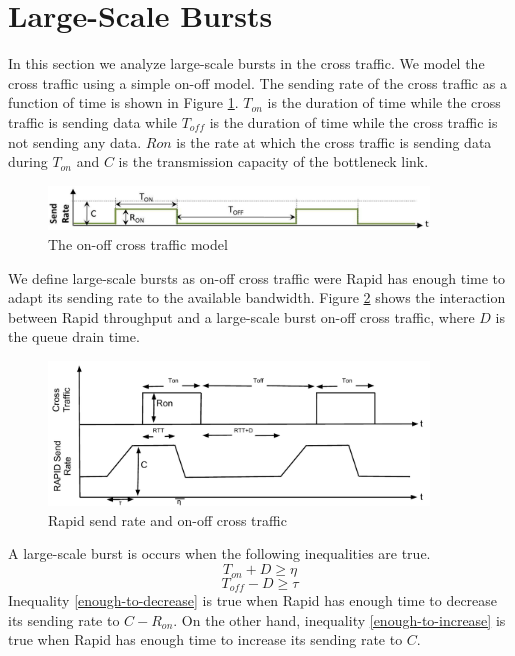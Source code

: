 \section{Large-Scale Bursts}
  In this section we analyze large-scale bursts in the cross traffic. We model 
  the cross traffic using a simple on-off model. The sending rate of the cross 
  traffic as a function of time is shown in Figure \ref{cross-traffic}. 
  $T_{on}$ is the duration of time while the cross traffic is sending data 
  while $T_{off}$ is the duration of time while the cross traffic is not 
  sending any data. $Ron$ is the rate at which the cross traffic is sending 
  data during $T_{on}$ and $C$ is the transmission capacity of the bottleneck 
  link.
  \begin{figure}[hbp]
    \centering
    \includegraphics[width=0.9\textwidth]{img/cross-traffic.png}
    \caption{The on-off cross traffic model}
    \label{cross-traffic}
  \end{figure}

  We define large-scale bursts as on-off cross traffic were Rapid has 
  enough time to adapt its sending rate to the available bandwidth. Figure 
  \ref{large-burst} shows the interaction between Rapid throughput and a 
  large-scale burst on-off cross traffic, where $D$ is the queue drain time.
  \begin{figure}[hbp]
    \centering
    \includegraphics[width=0.9\textwidth]{img/large-burst.pdf}
    \caption{Rapid send rate and on-off cross traffic}
    \label{large-burst}
  \end{figure}
  
  A large-scale burst is occurs when the following inequalities are true.
  \begin{equation}
    T_{on} + D \ge \eta
    \label{enough-to-decrease}
  \end{equation}
  \begin{equation}
    T_{off} - D \ge \tau
    \label{enough-to-increase}
  \end{equation}
  Inequality \eqref{enough-to-decrease} is true when Rapid has enough time 
  to decrease its sending rate to $C - R_{on}$. On the other hand, inequality 
  \eqref{enough-to-increase} is true when Rapid has enough time to increase 
  its sending rate to $C$.

